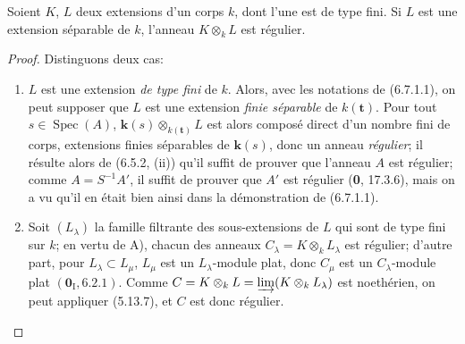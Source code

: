 \begin{lemma}[6.7.4.1]
\label{IV.2.s6.7.4.1-fr}
Soient $K$, $L$ deux extensions d'un corps $k$, dont l'une est de type
fini. Si $L$ est une extension séparable de $k$, l'anneau $K\otimes_kL$
est régulier.
\end{lemma}

\begin{proof}
Distinguons deux cas:

\begin{enumerate}
\item[A)] $L$ est une extension \emph{de type fini} de $k$. Alors, avec les
notations de (6.7.1.1), on peut supposer que $L$ est une extension \emph{finie
séparable} de $k(\mathbf t)$. Pour tout $s\in\operatorname{Spec}(A)$,
$\boldsymbol{k}(s)\otimes_{k(\mathbf t)}L$ est alors composé direct d'un nombre
fini de corps, extensions finies séparables de $\boldsymbol{k}(s)$, donc un anneau
\emph{régulier}; il résulte alors de (6.5.2, (ii)) qu'il suffit de prouver que
l'anneau $A$ est régulier; comme $A=S^{-1}A'$, il suffit de prouver que
$A'$ est régulier (\textbf{0}, 17.3.6), mais on a vu qu'il en était bien ainsi dans
la démonstration de (6.7.1.1).
\item[B)] Soit $(L_\lambda)$ la famille filtrante des sous-extensions de
$L$ qui sont de type fini sur $k$; en vertu de A), chacun des anneaux
$C_\lambda=K\otimes_kL_\lambda$ est régulier; d'autre part, pour
$L_\lambda\subset L_\mu$, $L_\mu$ est un $L_\lambda$-module plat, donc
$C_\mu$ est un $C_\lambda$-module plat $(\mathbf{0}_{\mathrm I},6.2.1)$. Comme
$C=K\otimes_kL=\varinjlim(K\otimes_kL_\lambda)$ est noethérien, on peut
appliquer (5.13.7), et $C$ est donc régulier.
\end{enumerate}
\end{proof}

